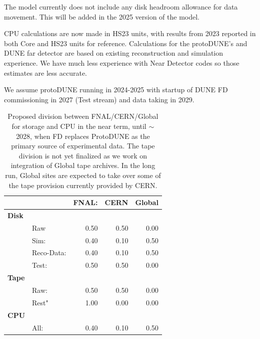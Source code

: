 \documentclass[12pt]{article}
\begin{document}
The model currently does not include any disk headroom allowance for data movement.  This will be added in the 2025 version of the model. 

CPU calculations are now made in HS23 units, with results from  2023 reported in both Core and HS23 units for reference.  Calculations for the protoDUNE's and DUNE far detector are based on existing reconstruction and simulation experience.  We have much less experience with Near Detector codes so those estimates are less accurate.

We assume protoDUNE running in 2024-2025 with startup of DUNE FD commissioning in 2027 (Test stream) and data taking in 2029. 



\begin{table}[h]
\begin{centering}
%

     \begin{tabular}{|ll|rrr|}
     \hline
 &&FNAL:&CERN & Global \\
 \hline
 {\bf Disk} &&&&\\
 &Raw&   0.50&   0.50&  0.00\\ 
 &Sim: & 0.40&  0.10&  0.50\\
 &Reco-Data: &  0.40&   0.10&  0.50\\ 
 &Test: &  0.50& 0.50&   0.00\\
  \hline
{\bf Tape} &&&&\\
  &Raw:&   0.50&   0.50&  0.00\\ 
  &Rest"&  1.00 & 0.00 & 0.00\\
  \hline
{\bf CPU} &&&&\\
  &All: & 0.40& 0.10&0.50\\
  \hline
   \end{tabular}
  \caption{Proposed division between FNAL/CERN/Global for storage and CPU in the near term, until $\sim$2028, when FD replaces ProtoDUNE as the primary source of experimental data.  The tape division is not yet finalized as we work on integration of Global tape archives. In the long run, Global sites are expected to take over some of the tape provision currently provided by CERN. }

   \label{tab:division}
   \end{centering}
   \end{table}
\end{document}
